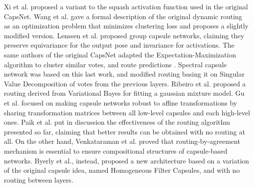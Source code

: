 \documentclass{article}
\begin{document}
Xi et al.\cite{xi2017capsule} proposed a variant to the squash activation function used in the original CapsNet. Wang et al. \cite{wang2018optimization} gave a formal description of the original dynamic routing as an optimization problem that minimizes clustering loss and proposes a slightly modified version. Lenssen et al. \cite{lenssen2018group} proposed group capsule networks, claiming they preserve equivariance for the output pose and invariance for activations. The same authors of the original CapsNet adapted the Expectation-Maximization algorithm to cluster similar votes, and route predictions \cite{hinton2018matrix}. Spectral capsule network \cite{bahadori2018spectral} was based on this last work, and modified routing basing it on Singular Value Decomposition of votes from the previous layers. Ribeiro et al. \cite{ribeiro2020capsule} proposed a routing derived from Variational Bayes for fitting a gaussian mixture model. Gu et al. \cite{gu2020improving} focused on making capsule networks 
robust to affine transformations by sharing transformation matrices between all low-level capsules and each high-level ones. Paik et al. \cite{paik2019capsule} put in discussion the effectiveness of the routing algorithm presented so far, claiming that better results can be obtained with no routing at all. On the other hand, Venkataraman et al. \cite{venkatraman2020learning} proved that routing-by-agreement mechanism is essential to ensure compositional structures of capsule-based networks. Byerly et al.\cite{byerly2020branching}, instead, proposed a new architecture based on a variation of the original capsule idea, named Homogeneous Filter Capsules, and with no routing between layers.
\end{document}
